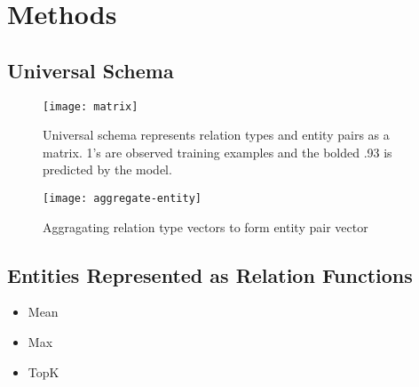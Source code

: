 \section{Methods \label{sec:methods}}

\subsection {Universal Schema}

\begin{figure}[h]
\caption{Universal schema represents relation types and entity pairs as a matrix.
1's are observed training examples and the bolded .93 is predicted by the model.}
\centering
\texttt{[image: matrix]}
\end{figure}

\begin{figure}[h]
\caption{Aggragating relation type vectors to form entity pair vector}
\centering
\texttt{[image: aggregate-entity]}
\end{figure}


\subsection {Entities Represented as Relation Functions}
\begin{itemize}
  \item Mean
  \item Max
  \item TopK
\end{itemize}